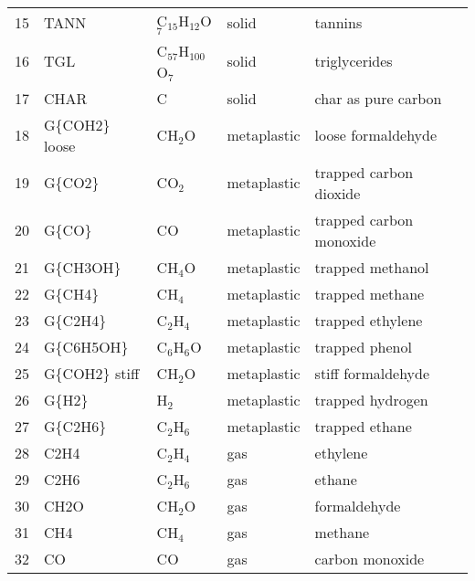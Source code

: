 \begin{center}
\begin{longtable}{cllll}
        15 & TANN           & C$_{15}$H$_{12}$O$_7$   & \cellcolor{green!25}solid        & tannins \\
        16 & TGL            & C$_{57}$H$_{100}$O$_7$  & \cellcolor{green!25}solid        & triglycerides \\
        17 & CHAR           & C                       & \cellcolor{green!25}solid        & char as pure carbon \\
        18 & G\{COH2\} loose& CH$_2$O                 & \cellcolor{orange!25}metaplastic & loose formaldehyde \\
        19 & G\{CO2\}       & CO$_2$                  & \cellcolor{orange!25}metaplastic & trapped carbon dioxide \\
        20 & G\{CO\}        & CO                      & \cellcolor{orange!25}metaplastic & trapped carbon monoxide \\
        21 & G\{CH3OH\}     & CH$_4$O                 & \cellcolor{orange!25}metaplastic & trapped methanol \\
        22 & G\{CH4\}       & CH$_4$                  & \cellcolor{orange!25}metaplastic & trapped methane \\
        23 & G\{C2H4\}      & C$_2$H$_4$              & \cellcolor{orange!25}metaplastic & trapped ethylene \\
        24 & G\{C6H5OH\}    & C$_6$H$_6$O             & \cellcolor{orange!25}metaplastic & trapped phenol \\
        25 & G\{COH2\} stiff& CH$_2$O                 & \cellcolor{orange!25}metaplastic & stiff formaldehyde \\
        26 & G\{H2\}        & H$_2$                   & \cellcolor{orange!25}metaplastic & trapped hydrogen \\
        27 & G\{C2H6\}      & C$_2$H$_6$              & \cellcolor{orange!25}metaplastic & trapped ethane \\
        28 & C2H4           & C$_2$H$_4$              & \cellcolor{purple!25}gas         & ethylene \\
        29 & C2H6           & C$_2$H$_6$              & \cellcolor{purple!25}gas         & ethane \\
        30 & CH2O           & CH$_2$O                 & \cellcolor{purple!25}gas         & formaldehyde \\
        31 & CH4            & CH$_4$                  & \cellcolor{purple!25}gas         & methane \\
        32 & CO             & CO                      & \cellcolor{purple!25}gas         & carbon monoxide \\

\end{longtable}
\end{center}
